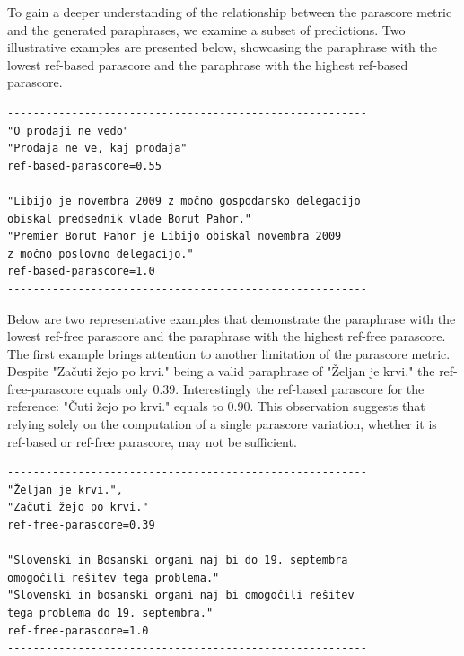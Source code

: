 \documentclass[fleqn,moreauthors,10pt]{ds_report}
\begin{document}
To gain a deeper understanding of the relationship between the parascore metric and the generated paraphrases, we examine a subset of predictions. Two illustrative examples are presented below, showcasing the paraphrase with the lowest ref-based parascore and the paraphrase with the highest ref-based parascore.
\begin{scriptsize}
\begin{verbatim}
--------------------------------------------------------
"O prodaji ne vedo"
"Prodaja ne ve, kaj prodaja"
ref-based-parascore=0.55

"Libijo je novembra 2009 z močno gospodarsko delegacijo 
obiskal predsednik vlade Borut Pahor." 
"Premier Borut Pahor je Libijo obiskal novembra 2009 
z močno poslovno delegacijo."
ref-based-parascore=1.0
--------------------------------------------------------
\end{verbatim}
\end{scriptsize}

Below are two representative examples that demonstrate the paraphrase with the lowest ref-free parascore and the paraphrase with the highest ref-free parascore.  The first example brings attention to another limitation of the parascore metric. Despite "Začuti žejo po krvi." being a valid paraphrase of "Željan je krvi." the ref-free-parascore equals only $0.39$. Interestingly the ref-based parascore for the reference:  "Čuti žejo po krvi." equals to $0.90$. This observation suggests that relying solely on the computation of a single parascore variation, whether it is ref-based or ref-free parascore, may not be sufficient. 

\begin{scriptsize}
\begin{verbatim}
--------------------------------------------------------
"Željan je krvi.",  
"Začuti žejo po krvi."
ref-free-parascore=0.39

"Slovenski in Bosanski organi naj bi do 19. septembra 
omogočili rešitev tega problema."
"Slovenski in bosanski organi naj bi omogočili rešitev
tega problema do 19. septembra."
ref-free-parascore=1.0
--------------------------------------------------------
\end{verbatim}

\end{scriptsize}

\end{document}
